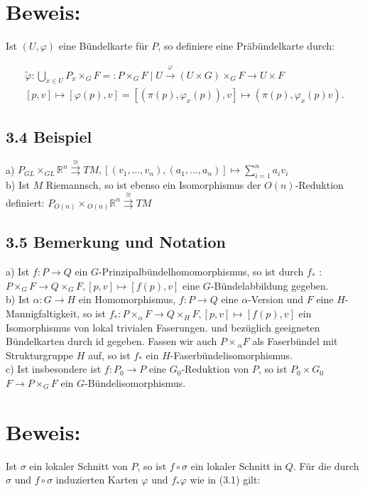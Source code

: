 \documentclass[10pt, letterpaper]{article}
\begin{document}
\section*{Beweis:}
Ist $(U, \varphi)$ eine Bündelkarte für $P$, so definiere eine Präbündelkarte durch:


\begin{gather*}
\tilde{\varphi}: \bigcup_{x \in U} P_{x} \times_{G} F=: P \times_{G} F \mid U \xrightarrow{\varphi}(U \times G) \times_{G} F \rightarrow U \times F  \tag{3.1}\\
{[p, v] \mapsto[\varphi(p), v]=\left[\left(\pi(p), \varphi_{x}(p)\right), v\right] \mapsto\left(\pi(p), \varphi_{x}(p) v\right) .}
\end{gather*}


\subsection*{3.4 Beispiel}
a) $P_{G L} \times_{G L} \mathbb{R}^{n} \stackrel{\cong}{\rightrightarrows} T M,\left[\left(v_{1}, \ldots, v_{n}\right),\left(a_{1}, \ldots, a_{n}\right)\right] \mapsto \sum_{i=1}^{n} a_{i} v_{i}$\\
b) Ist $M$ Riemannsch, so ist ebenso ein Isomorphismus der $O(n)$-Reduktion definiert: $P_{O(n)} \times{ }_{O(n)} \mathbb{R}^{n} \stackrel{\cong}{\rightrightarrows} T M$

\subsection*{3.5 Bemerkung und Notation}
a) Ist $f: P \rightarrow Q$ ein $G$-Prinzipalbündelhomomorphismus, so ist durch $f_{*}$ : $P \times_{G} F \rightarrow Q \times_{G} F,[p, v] \mapsto[f(p), v]$ eine $G$-Bündelabbildung gegeben.\\
b) Ist $\alpha: G \rightarrow H$ ein Homomorphismus, $f: P \rightarrow Q$ eine $\alpha$-Version und $F$ eine $H$-Mannigfaltigkeit, so ist $f_{*}: P \times_{\alpha} F \rightarrow Q \times_{H} F,[p, v] \mapsto[f(p), v]$ ein Isomorphismus von lokal trivialen Faserungen. und bezüglich geeigneten Bündelkarten durch id gegeben. Fassen wir auch $P \times{ }_{\alpha} F$ als Faserbündel mit Strukturgruppe $H$ auf, so ist $f_{*}$ ein $H$-Faserbündelisomorphismus.\\
c) Ist insbesondere ist $f: P_{0} \rightarrow P$ eine $G_{0}$-Reduktion von $P$, so ist $P_{0} \times G_{0}$ $F \rightarrow P \times_{G} F$ ein $G$-Bündelisomorphismus.

\section*{Beweis:}
Ist $\sigma$ ein lokaler Schnitt von $P$, so ist $f \circ \sigma$ ein lokaler Schnitt in $Q$. Für die durch $\sigma$ und $f \circ \sigma$ induzierten Karten $\varphi$ und $f_{*} \varphi$ wie in (3.1) gilt:
\end{document}
